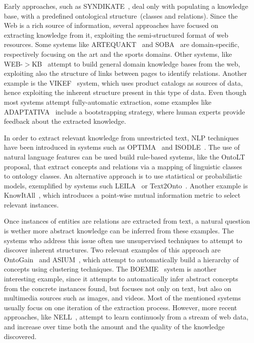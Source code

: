       Early approaches, such as SYNDIKATE~\cite{syndikate}, deal only with populating a
      knowledge base, with a predefined ontological structure~(classes and relations).
      Since the Web is a rich source of information, several approaches have focused on extracting knowledge
      from it, exploiting the semi-structured format of web resources.
      Some systems like ARTEQUAKT~\cite{artequakt} and SOBA~\cite{soba} are domain-specific,
      respectively focusing on the art and the sports domains.
      Other systems, like WEB-$>$KB~\cite{webkb} attempt to build general domain knowledge bases from the
      web, exploiting also the structure of links between pages to identify relations.
      Another example is the VIKEF~\cite{vikef} system, which uses product catalogs as sources of data, hence exploiting the
      inherent structure present in this type of data.
      Even though most systems attempt fully-automatic extraction, some examples like ADAPTATIVA~\cite{adaptativa} include
      a bootstrapping strategy, where human experts provide feedback about the extracted knowledge.

      In order to extract relevant knowledge from unrestricted text, NLP techniques have
      been introduced in systems such as OPTIMA~\cite{optima} and ISODLE~\cite{isolde}.
      The use of natural language features can be used build rule-based systems,
      like the OntoLT~\cite{buitelaar2004ontolt} proposal, that extract concepts and
    relations via a mapping of linguistic classes to ontology classes.
      An alternative approach is to use statistical or probabilistic models,
      exemplified by systems such LEILA~\cite{leila} or Text2Onto~\cite{cimiano2005text2onto}.
      Another example is KnowItAll~\cite{knowitall}, which introduces a point-wise mutual information
      metric to select relevant instances.

    Once instances of entities are relations are extracted from text, a natural question is
      wether more abstract knowledge can be inferred from these examples.
      The systems who address this issue often use unsupervised techniques to attempt
      to discover inherent structures. Two relevant examples of this approach
      are OntoGain~\cite{drymonas2010unsupervised} and ASIUM~\cite{asium},
      which attempt to automatically build a hierarchy of concepts using clustering techniques.
      The BOEMIE~\cite{boemie} system is another interesting example, since it
      attempts to automatically infer abstract concepts from the concrete instances found,
      but focuses not only on text, but also on multimedia sources such as images, and videos.
      Most of the mentioned systems usually focus on one iteration of the extraction process.
      However, more recent approaches, like NELL~\cite{mitchell2015never}, attempt
      to learn continuosly from a stream of web data, and increase over time
      both the amount and the quality of the knowledge discovered.

